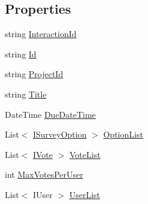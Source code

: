 \subsection*{Properties}
\begin{DoxyCompactItemize}
\item 
string \hyperlink{interface_plex_byte_1_1_mo_cap_1_1_interactions_1_1_i_survey_ad3a9fd1847c33d3204fa274ace8b9846}{Interaction\+Id}
\item 
string \hyperlink{interface_plex_byte_1_1_mo_cap_1_1_interactions_1_1_i_survey_a6fb9f2c7bae0aa503035393f1af6b3b2}{Id}
\item 
string \hyperlink{interface_plex_byte_1_1_mo_cap_1_1_interactions_1_1_i_survey_a883f1354055ab9ee92c915b0c80e4f09}{Project\+Id}
\item 
string \hyperlink{interface_plex_byte_1_1_mo_cap_1_1_interactions_1_1_i_survey_ae7b5e153360d5d3ecba8c2d7a6f12bf4}{Title}
\item 
Date\+Time \hyperlink{interface_plex_byte_1_1_mo_cap_1_1_interactions_1_1_i_survey_a1889aa237e8b5f47ac9efe0aece8e574}{Due\+Date\+Time}
\item 
List$<$ \hyperlink{interface_plex_byte_1_1_mo_cap_1_1_interactions_1_1_i_survey_option}{I\+Survey\+Option} $>$ \hyperlink{interface_plex_byte_1_1_mo_cap_1_1_interactions_1_1_i_survey_aa346d9b90290f6d4871624d8ed2b848b}{Option\+List}
\item 
List$<$ \hyperlink{interface_plex_byte_1_1_mo_cap_1_1_interactions_1_1_i_vote}{I\+Vote} $>$ \hyperlink{interface_plex_byte_1_1_mo_cap_1_1_interactions_1_1_i_survey_a86a110a0d3506ced724e5246fb3596ad}{Vote\+List}
\item 
int \hyperlink{interface_plex_byte_1_1_mo_cap_1_1_interactions_1_1_i_survey_a6518ebe3241906e81538e26e8df343c9}{Max\+Votes\+Per\+User}
\item 
List$<$ I\+User $>$ \hyperlink{interface_plex_byte_1_1_mo_cap_1_1_interactions_1_1_i_survey_a6b54305054f73c4a53a1293316a690fe}{User\+List}
\end{DoxyCompactItemize}


